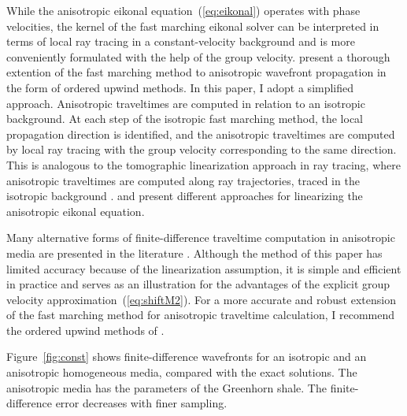 While the anisotropic eikonal equation~(\ref{eq:eikonal}) operates with phase
velocities, the kernel of the fast marching eikonal solver can be interpreted
in terms of local ray tracing in a constant-velocity background
\cite[]{Fomel.sep.95.sergey3} and is more conveniently formulated with the help
of the group velocity. \cite{alex} present a thorough extention of the
fast marching method to anisotropic wavefront propagation in the form of
ordered upwind methods. In this paper, I adopt a simplified approach.
Anisotropic traveltimes are computed in relation to an isotropic background.
At each step of the isotropic fast marching method, the local propagation
direction is identified, and the anisotropic traveltimes are computed by local
ray tracing with the group velocity corresponding to the same direction.  This
is analogous to the tomographic linearization approach in ray tracing, where
anisotropic traveltimes are computed along ray trajectories, traced in the
isotropic background \cite[]{pratt}. \cite{tariq} and \cite{schneider}
present different approaches for linearizing the anisotropic eikonal equation.

Many alternative forms of finite-difference traveltime computation in
anisotropic media are presented in the literature
\cite[]{GEO58-09-13491358,SEG-1997-1786,SEG-1999-18751878,ANI00-00-03330338,SEG-2001-12251228,qin,linbin}.
Although the method of this paper has limited accuracy because of the
linearization assumption, it is simple and efficient in practice and serves as
an illustration for the advantages of the explicit group velocity
approximation~(\ref{eq:shiftM2}).  For a more accurate and robust extension of
the fast marching method for anisotropic traveltime calculation, I recommend
the ordered upwind methods of \cite{alex,alex2}.


Figure~\ref{fig:const} shows finite-difference wavefronts for an isotropic and
an anisotropic homogeneous media, compared with the exact solutions. The
anisotropic media has the parameters of the Greenhorn shale. The
finite-difference error decreases with finer sampling.


